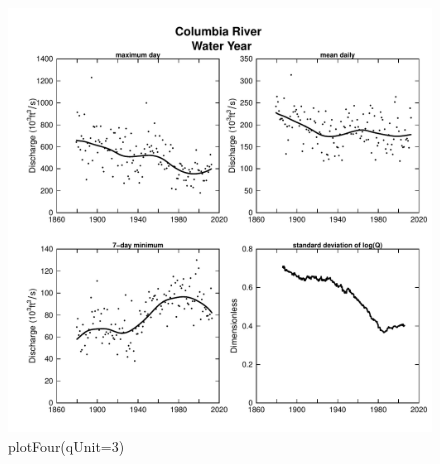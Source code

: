 \documentclass[a4paper,11pt]{article}\usepackage{graphicx, color}
\newenvironment{knitrout}{}{} %
\begin{document}
\begin{knitrout}
\color{fgcolor}\begin{figure}[]

\includegraphics[width=1\linewidth,height=1\linewidth]{figure/plotFour} \caption[plotFour(qUnit=3)]{plotFour(qUnit=3)\label{fig:plotFour}}
\end{figure}


\end{knitrout}
\end{document}
